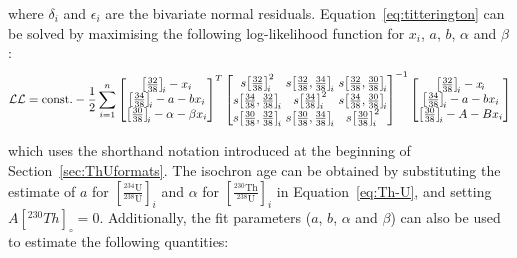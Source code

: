 \begin{refsection}
\noindent where $\delta_i$ and $\epsilon_i$ are the bivariate normal
residuals. Equation~\ref{eq:titterington} can be solved by maximising
the following log-likelihood function for $x_i$, $a$, $b$, $\alpha$
and $\beta$:
\begin{equation}
  \mathcal{LL} = \mbox{const.} - 
  \frac{1}{2} \sum\limits_{i=1}^{n}
  \left[
    \begin{array}{@{}c@{}}
      \left[\frac{32}{38}\right]_{\!i} - x_{i} \\
      \left[\frac{34}{38}\right]_{\!i} - a - b x_{i} \\
      \left[\frac{30}{38}\right]_{\!i} - \alpha - \beta x_{i}
    \end{array}
    \right]^T
  \left[
    \begin{array}{@{}c@{~}c@{~}c@{}}
      s\!\left[\frac{32}{38}\right]_{\!i}^2 &
      s\!\left[\frac{32}{38},\frac{34}{38}\right]_{\!i} &
      s\!\left[\frac{32}{38},\frac{30}{38}\right]_{\!i} \\
      s\!\left[\frac{34}{38},\frac{32}{38}\right]_{\!i} &
      s\!\left[\frac{34}{38}\right]_{\!i}^2 &
      s\!\left[\frac{34}{38},\frac{30}{38}\right]_{\!i} \\
      s\!\left[\frac{30}{38},\frac{32}{38}\right]_{\!i} &
      s\!\left[\frac{30}{38},\frac{34}{38}\right]_{\!i} &
      s\!\left[\frac{30}{38}\right]_{\!i}^2
    \end{array}
    \right]^{-1}
  \left[
    \begin{array}{@{}c@{}}
      \left[\frac{32}{38}\right]_{\!i} - x_{\!i} \\
      \left[\frac{34}{38}\right]_{\!i} - a - b x_{i} \\
      \left[\frac{30}{38}\right]_{\!i} - A - B x_{i}
    \end{array}
    \right]
\end{equation}

\noindent which uses the shorthand notation introduced at the
beginning of Section~\ref{sec:ThUformats}. The isochron age can be
obtained by substituting the estimate of $a$ for
$\left[\frac{{}^{234}\mbox{U}}{{}^{238}\mbox{U}}\right]_i$ and
$\alpha$ for
$\left[\frac{{}^{230}\mbox{Th}}{{}^{238}\mbox{U}}\right]_i$ in
Equation~\ref{eq:Th-U}, and setting $A[{}^{230}Th]_{\circ}=0$.
Additionally, the fit parameters ($a$, $b$, $\alpha$ and $\beta$) can
also be used to estimate the following quantities:


\end{refsection}
